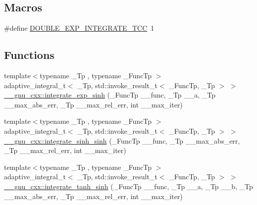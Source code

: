\subsection*{Macros}
\begin{DoxyCompactItemize}
\item 
\#define \hyperlink{double__exp__integrate_8tcc_a939b63d0839d3b313a4f6b094d3ea9e9}{D\+O\+U\+B\+L\+E\+\_\+\+E\+X\+P\+\_\+\+I\+N\+T\+E\+G\+R\+A\+T\+E\+\_\+\+T\+CC}~1
\end{DoxyCompactItemize}
\subsection*{Functions}
\begin{DoxyCompactItemize}
\item 
{\footnotesize template$<$typename \+\_\+\+Tp , typename \+\_\+\+Func\+Tp $>$ }\\adaptive\+\_\+integral\+\_\+t$<$ \+\_\+\+Tp, std\+::invoke\+\_\+result\+\_\+t$<$ \+\_\+\+Func\+Tp, \+\_\+\+Tp $>$ $>$ \hyperlink{namespace____gnu__cxx_a8d2d406894714b19396add57a77260c4}{\+\_\+\+\_\+gnu\+\_\+cxx\+::integrate\+\_\+exp\+\_\+sinh} (\+\_\+\+Func\+Tp \+\_\+\+\_\+func, \+\_\+\+Tp \+\_\+\+\_\+a, \+\_\+\+Tp \+\_\+\+\_\+max\+\_\+abs\+\_\+err, \+\_\+\+Tp \+\_\+\+\_\+max\+\_\+rel\+\_\+err, int \+\_\+\+\_\+max\+\_\+iter)
\item 
{\footnotesize template$<$typename \+\_\+\+Tp , typename \+\_\+\+Func\+Tp $>$ }\\adaptive\+\_\+integral\+\_\+t$<$ \+\_\+\+Tp, std\+::invoke\+\_\+result\+\_\+t$<$ \+\_\+\+Func\+Tp, \+\_\+\+Tp $>$ $>$ \hyperlink{namespace____gnu__cxx_ab28f15831507df5ef94f271648fb2263}{\+\_\+\+\_\+gnu\+\_\+cxx\+::integrate\+\_\+sinh\+\_\+sinh} (\+\_\+\+Func\+Tp \+\_\+\+\_\+func, \+\_\+\+Tp \+\_\+\+\_\+max\+\_\+abs\+\_\+err, \+\_\+\+Tp \+\_\+\+\_\+max\+\_\+rel\+\_\+err, int \+\_\+\+\_\+max\+\_\+iter)
\item 
{\footnotesize template$<$typename \+\_\+\+Tp , typename \+\_\+\+Func\+Tp $>$ }\\adaptive\+\_\+integral\+\_\+t$<$ \+\_\+\+Tp, std\+::invoke\+\_\+result\+\_\+t$<$ \+\_\+\+Func\+Tp, \+\_\+\+Tp $>$ $>$ \hyperlink{namespace____gnu__cxx_a814fe9e5540142d7cfd6513247b73ab5}{\+\_\+\+\_\+gnu\+\_\+cxx\+::integrate\+\_\+tanh\+\_\+sinh} (\+\_\+\+Func\+Tp \+\_\+\+\_\+func, \+\_\+\+Tp \+\_\+\+\_\+a, \+\_\+\+Tp \+\_\+\+\_\+b, \+\_\+\+Tp \+\_\+\+\_\+max\+\_\+abs\+\_\+err, \+\_\+\+Tp \+\_\+\+\_\+max\+\_\+rel\+\_\+err, int \+\_\+\+\_\+max\+\_\+iter)
\end{DoxyCompactItemize}


